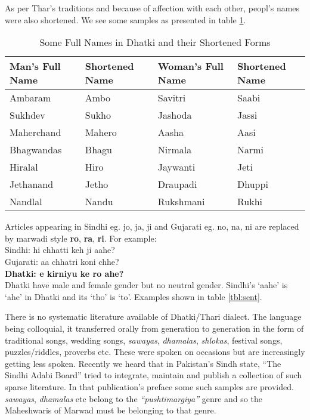 As per Thar's traditions and because of affection with each other, peopl's names
were also shortened. We see some samples as presented in table \ref{tbl:names}.
\begin{table}
\begin{center}
\begin{tabular}{l|l|l|l}
\hline
\textbf{Man's Full Name}  & \textbf{Shortened Name} & \textbf{Woman's Full Name} & \textbf{Shortened Name} \\
\hline
Ambaram & Ambo & Savitri & Saabi\\
Sukhdev & Sukho & Jashoda & Jassi\\
Maherchand & Mahero & Aasha & Aasi\\
Bhagwandas & Bhagu & Nirmala & Narmi\\
Hiralal & Hiro & Jaywanti & Jeti\\
Jethanand & Jetho & Draupadi & Dhuppi\\
Nandlal & Nandu & Rukshmani & Rukhi\\
\hline
\end{tabular}
\end{center}
\caption{Some Full Names in Dhatki and their Shortened Forms}
\label{tbl:names}
\end{table}
Articles appearing in Sindhi eg. jo, ja, ji and Gujarati eg. no, na, ni are
replaced by marwadi style \textbf{ro}, \textbf{ra}, \textbf{ri}. For example:\\

Sindhi: hi chhatti keh ji aahe?\\
Gujarati: aa chhatri koni chhe?\\
\textbf{Dhatki: e kirniyu ke ro ahe?}\\

Dhatki have male and female gender but no neutral gender. Sindhi's `aahe' is
`ahe' in Dhatki and its `tho' is `to'. Examples shown in table \ref{tbl:sent}.

There is no systematic literature available of Dhatki/Thari dialect. The
language being colloquial, it transferred orally from generation to generation
in the form of traditional songs, wedding songs, \textit{sawayas},
\textit{dhamalas}, \textit{shlokas}, festival songs, puzzles/riddles, proverbs
etc. These were spoken on occasions but are increasingly getting less spoken.
Recently we heard that in Pakistan's Sindh state, ``The Sindhi Adabi Board''
tried to integrate, maintain and publish a collection of such sparse literature.
In that publication's preface some such samples are provided. \textit{sawayas},
\textit{dhamalas} etc belong to the \textit{``pushtimargiya''} genre and so the
Maheshwaris of Marwad must be belonging to that genre.

